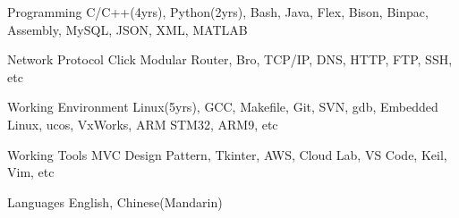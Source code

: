 

\begin{cvskills}

  \cvskill
    {Programming} %
    {C/C++(4yrs), Python(2yrs), Bash, Java, Flex, Bison, Binpac, Assembly, MySQL, JSON, XML, MATLAB} %

  \cvskill
    {Network Protocol} %
    {Click Modular Router, Bro, TCP/IP, DNS, HTTP, FTP, SSH, etc} %

  \cvskill
    {Working Environment} %
    {Linux(5yrs), GCC, Makefile, Git, SVN, gdb, Embedded Linux, ucos, VxWorks, ARM STM32, ARM9, etc} %

  \cvskill
    {Working Tools} %
    {MVC Design Pattern, Tkinter, AWS, Cloud Lab, VS Code, Keil, Vim, etc} %

  \cvskill
    {Languages} %
    {English, Chinese(Mandarin)} %


\end{cvskills}

